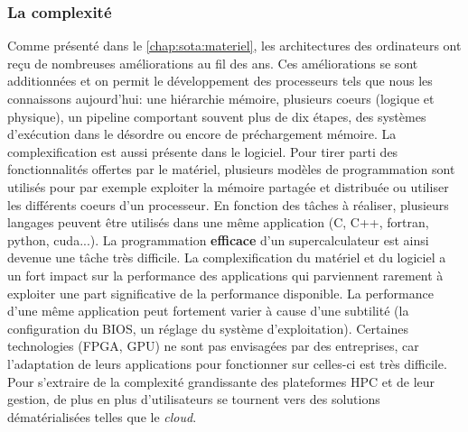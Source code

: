     \subsubsection{La complexité}\label{sec:edl_chal_complexite}
        
        Comme présenté dans le \autoref{chap:sota:materiel}, les architectures des ordinateurs ont reçu de nombreuses améliorations au fil des ans. Ces améliorations se sont additionnées et on permit le développement des processeurs tels que nous les connaissons aujourd'hui: une hiérarchie mémoire, plusieurs coeurs (logique et physique), un pipeline comportant souvent plus de dix étapes, des systèmes d'exécution dans le désordre ou encore de préchargement mémoire. La complexification est aussi présente dans le logiciel. Pour tirer parti des fonctionnalités offertes par le matériel, plusieurs modèles de programmation sont utilisés pour par exemple exploiter la mémoire partagée et distribuée ou utiliser les différents coeurs d'un processeur. En fonction des tâches à réaliser, plusieurs langages peuvent être utilisés dans une même application (C, C++, fortran, python, cuda...). La programmation \textbf{efficace} d'un supercalculateur est ainsi devenue une tâche très difficile. La complexification du matériel et du logiciel a un fort impact sur la performance des applications qui parviennent rarement à exploiter une part significative de la performance disponible. La performance d’une même application peut fortement varier à cause d’une subtilité (la configuration du BIOS, un réglage du système d’exploitation). Certaines technologies (FPGA, GPU) ne sont pas envisagées par des entreprises, car l'adaptation de leurs applications pour fonctionner sur celles-ci est très difficile. Pour s'extraire de la complexité grandissante des plateformes HPC et de leur gestion, de plus en plus d'utilisateurs se tournent vers des solutions dématérialisées telles que le \textit{cloud}.
        
        
